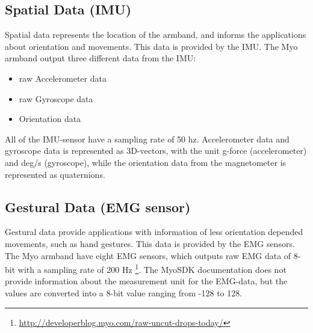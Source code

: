 \subsection{Spatial Data (IMU)}
Spatial data represents the location of the armband, and informs the applications about orientation and movements. This data is provided by the IMU. The Myo armband output three different data from the IMU: 
\begin{itemize}
  \item raw Accelerometer data
  \item raw Gyroscope data
  \item Orientation data
\end{itemize}
All of the IMU-sensor have a sampling rate of 50 hz. Accelerometer data and gyroscope data is represented as 3D-vectors, with the unit g-force (accelerometer) and deg/s (gyroscope), while the orientation data from the magnetometer is represented as quaternions.

\subsection{Gestural Data (EMG sensor)}
\label{subsec:myoEmgSensor}
Gestural data provide applications with information of less orientation depended movements, such as hand gestures. This data is provided by the EMG sensors. The Myo armband have eight EMG sensors, which outputs raw EMG data of 8-bit with a sampling rate of 200 Hz \footnote{\url{http://developerblog.myo.com/raw-uncut-drops-today/}}. The MyoSDK documentation \cite{myoSDK} does not provide information about the measurement unit for the EMG-data, but the values are converted into a 8-bit value ranging from -128 to 128.